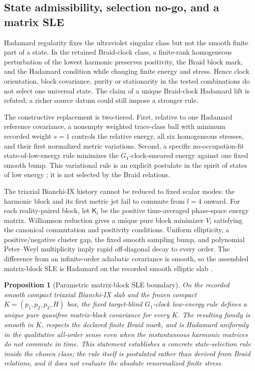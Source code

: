 \documentclass[11pt]{article}
\newtheorem{proposition}[theorem]{Proposition}
\theoremstyle{definition}
\theoremstyle{remark}
\begin{document}
\subsection{State admissibility, selection no-go, and a matrix SLE}

Hadamard regularity fixes the ultraviolet singular class but not the smooth finite part of a state. In the retained Braid-clock class, a finite-rank homogeneous perturbation of the lowest harmonic preserves positivity, the Braid block mark, and the Hadamard condition while changing finite energy and stress. Hence clock orientation, block covariance, purity or stationarity in the tested combinations do not select one universal state. The claim of a unique Braid-clock Hadamard lift is refuted; a richer source datum could still impose a stronger rule.

The constructive replacement is two-tiered. First, relative to one Hadamard reference covariance, a nonempty weighted trace-class ball with minimum recorded weight $s=1$ controls the relative energy, all six homogeneous stresses, and their first normalized metric variations. Second, a specific no-occupation-fit state-of-low-energy rule minimizes the $G_1$-clock-smeared energy against one fixed smooth bump. This variational rule is an explicit postulate in the spirit of states of low energy \cite{olbermann2007,banerjeeniedermaier2023}; it is not selected by the Braid relations.

The triaxial Bianchi-IX history cannot be reduced to fixed scalar modes: the harmonic block and its first metric jet fail to commute from $l=4$ onward. For each reality-paired block, let $\mathsf K_l$ be the positive time-averaged phase-space energy matrix. Williamson reduction gives a unique pure block minimizer $V_l$ satisfying the canonical commutation and positivity conditions. Uniform ellipticity, a positive/negative cluster gap, the fixed smooth sampling bump, and polynomial Peter--Weyl multiplicity imply rapid off-diagonal decay to every order. The difference from an infinite-order adiabatic covariance is smooth, so the assembled matrix-block SLE is Hadamard on the recorded smooth elliptic slab \cite{junkerschrohe2001,gerardetal2016}.

\begin{proposition}[Parametric matrix-block SLE boundary]\label{prop:sle}
On the recorded smooth compact triaxial Bianchi-IX slab and the frozen compact $K=(p_1,p_2,p_3,H)$ box, the fixed target-blind $G_1$-clock low-energy rule defines a unique pure quasifree matrix-block covariance for every $K$. The resulting family is smooth in $K$, respects the declared finite Braid mark, and is Hadamard uniformly in the qualitative all-order sense even when the instantaneous harmonic matrices do not commute in time. This statement establishes a concrete state-selection rule inside the chosen class; the rule itself is postulated rather than derived from Braid relations, and it does not evaluate the absolute renormalized finite stress.
\end{proposition}
\end{document}
